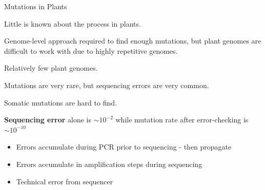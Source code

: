 \documentclass{beamer}
\begin{document}
\begin{frame}{Mutations in Plants}

	Little is known about the process in plants.

	\vfill

	Genome-level approach required to find enough mutations, but plant genomes are difficult to work with due to highly repetitive genomes.

	\vfill

	Relatively few plant genomes.



\end{frame}

\begin{frame}{Mutations are very rare, but sequencing errors are very common.}

Somatic mutations are hard to find.

\vfill

\textbf{Sequencing error} alone is \textbf{$\sim10^{-2}$} while mutation rate after error-checking is \textbf{$\sim10^{-10}$}

\begin{itemize}
\item Errors accumulate during PCR prior to sequencing - then propagate
\item Errors accumulate in amplification steps during sequencing
\item Technical error from sequencer
\end{itemize}

\end{frame}
\end{document}
